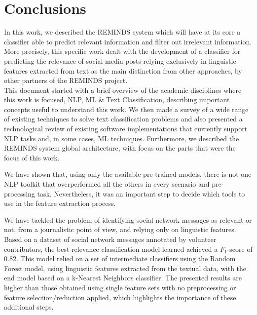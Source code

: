 
\chapter{Conclusions} %

\label{conclusions} %

In this work, we described the REMINDS system which will have at its core a classifier able to predict relevant information and filter out irrelevant information. More precisely, this specific work dealt with the development of a classifier for predicting the relevance of social media posts relying exclusively in linguistic features extracted from text as the main distinction from other approaches, by other partners of the REMINDS project. \\
This document started with a brief overview of the academic disciplines where this work is focused, NLP, ML \& Text Classification, describing important concepts useful to understand this work. We then made a survey of a wide range of existing techniques to solve text classification problems and also presented a technological review of existing software implementations that currently support NLP tasks and, in some cases, ML techniques. Furthermore, we described the REMINDS system global architecture, with focus on the parts that were the focus of this work.

We have shown that, using only the available pre-trained models, there is not one NLP toolkit that overperformed all the others in every scenario and pre-processing task. Nevertheless, it was an important step to decide which tools to use in the feature extraction process.

We have tackled the problem of identifying social network messages as relevant or not, from a journalistic point of view, and relying only on linguistic features. Based on a dataset of social network messages annotated by volunteer contributors, the best relevance classification model learned achieved a $F_1$-score of 0.82. This model relied on a set of intermediate classifiers using the Random Forest model, using linguistic features extracted from the textual data, with the end model based on a k-Nearest Neighbors classifier. The presented results are higher than those obtained using single feature sets with no preprocessing or feature selection/reduction applied, which highlights the importance of these additional steps.

